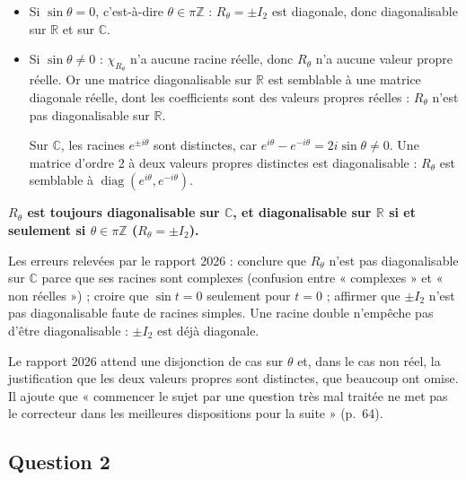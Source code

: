 \documentclass[11pt,a4paper]{article}
\begin{document}
\begin{itemize}
\item
  Si \(\sin\theta=0\), c'est-à-dire \(\theta\in\pi\mathbb{Z}\) : \(R_\theta=\pm I_2\) est diagonale, donc diagonalisable sur \(\mathbb{R}\) et sur \(\mathbb{C}\).
\item
  Si \(\sin\theta\neq0\) : \(\chi_{R_\theta}\) n'a aucune racine réelle, donc \(R_\theta\) n'a aucune valeur propre réelle. Or une matrice diagonalisable sur \(\mathbb{R}\) est semblable à une matrice diagonale réelle, dont les coefficients sont des valeurs propres réelles : \(R_\theta\) n'est pas diagonalisable sur \(\mathbb{R}\).

  Sur \(\mathbb{C}\), les racines \(e^{\pm i\theta}\) sont distinctes, car \(e^{i\theta}-e^{-i\theta}=2i\sin\theta\neq0\). Une matrice d'ordre 2 à deux valeurs propres distinctes est diagonalisable : \(R_\theta\) est semblable à \(\operatorname{diag}(e^{i\theta},e^{-i\theta})\).
\end{itemize}

\textbf{\(R_\theta\) est toujours diagonalisable sur \(\mathbb{C}\), et diagonalisable sur \(\mathbb{R}\) si et seulement si \(\theta\in\pi\mathbb{Z}\) (\(R_\theta=\pm I_2\)).}

\begin{piege}

Les erreurs relevées par le rapport 2026 : conclure que \(R_\theta\) n'est pas diagonalisable sur \(\mathbb{C}\) parce que ses racines sont complexes (confusion entre « complexes » et « non réelles ») ; croire que \(\sin t=0\) seulement pour \(t=0\) ; affirmer que \(\pm I_2\) n'est pas diagonalisable faute de racines simples. Une racine double n'empêche pas d'être diagonalisable : \(\pm I_2\) est déjà diagonale.

\end{piege}

\begin{jury}

Le rapport 2026 attend une disjonction de cas sur \(\theta\) et, dans le cas non réel, la justification que les deux valeurs propres sont distinctes, que beaucoup ont omise. Il ajoute que « commencer le sujet par une question très mal traitée ne met pas le correcteur dans les meilleures dispositions pour la suite » (p.~64).

\end{jury}

\hypertarget{question-2}{%
\subsection{Question 2}\label{question-2}}
\end{document}
